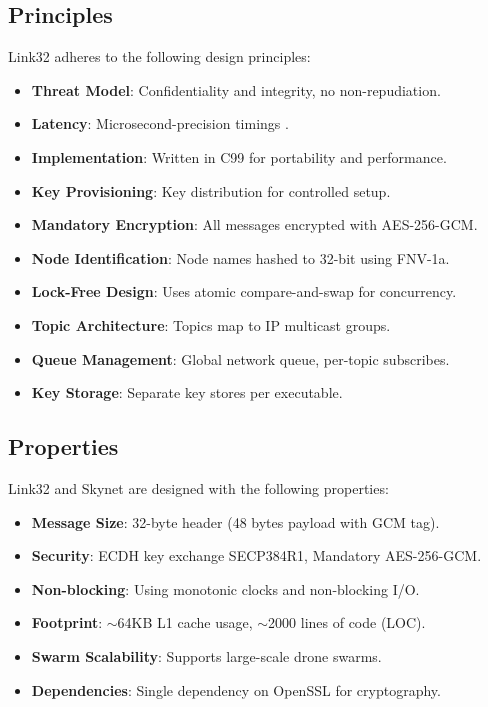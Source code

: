 \documentclass{article}
\begin{document}
\subsection{Principles}
Link32 adheres to the following design principles:
\begin{itemize}
    \item \textbf{Threat Model}: Confidentiality and integrity, no non-repudiation.
    \item \textbf{Latency}: Microsecond-precision timings .
    \item \textbf{Implementation}: Written in C99 for portability and performance.
    \item \textbf{Key Provisioning}: Key distribution for controlled setup.
    \item \textbf{Mandatory Encryption}: All messages encrypted with AES-256-GCM.
    \item \textbf{Node Identification}: Node names hashed to 32-bit using FNV-1a.
    \item \textbf{Lock-Free Design}: Uses atomic compare-and-swap for concurrency.
    \item \textbf{Topic Architecture}: Topics map to IP multicast groups.
    \item \textbf{Queue Management}: Global network queue, per-topic subscribes.
    \item \textbf{Key Storage}: Separate key stores per executable.
\end{itemize}

\subsection{Properties}
Link32 and Skynet are designed with the following properties:
\begin{itemize}
    \item \textbf{Message Size}: 32-byte header (48 bytes payload with GCM tag).
    \item \textbf{Security}: ECDH key exchange SECP384R1, Mandatory AES-256-GCM.
    \item \textbf{Non-blocking}: Using monotonic clocks and non-blocking I/O.
    \item \textbf{Footprint}: $\sim$64KB L1 cache usage, $\sim$2000 lines of code (LOC).
    \item \textbf{Swarm Scalability}: Supports large-scale drone swarms.
    \item \textbf{Dependencies}: Single dependency on OpenSSL for cryptography.
\end{itemize}
\end{document}
